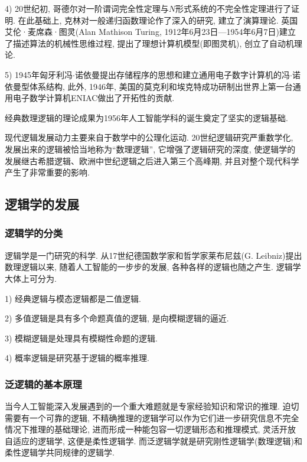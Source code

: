 4) 20世纪初, 哥德尔对一阶谓词完全性定理与$N$形式系统的不完全性定理进行了证明. 在此基础上, 克林对一般递归函数理论作了深入的研究, 建立了演算理论. 英国艾伦·麦席森·图灵(Alan Mathison Turing, 1912年6月23日—1954年6月7日)建立了描述算法的机械性思维过程, 提出了理想计算机模型(即图灵机), 创立了自动机理论.

5) 1945年匈牙利冯$\cdot$诺依曼提出存储程序的思想和建立通用电子数字计算机的冯$\cdot$诺依曼型体系结构, 此外, 1946年, 美国的莫克利和埃克特成功研制出世界上第一台通用电子数学计算机ENIAC做出了开拓性的贡献.
\begin{remark}
经典数理逻辑的理论成果为1956年人工智能学科的诞生奠定了坚实的逻辑基础.

现代逻辑发展动力主要来自于数学中的公理化运动. 20世纪逻辑研究严重数学化, 发展出来的逻辑被恰当地称为“数理逻辑”, 它增强了逻辑研究的深度, 使逻辑学的发展继古希腊逻辑、欧洲中世纪逻辑之后进入第三个高峰期, 并且对整个现代科学产生了非常重要的影响.
\end{remark}

\subsection{逻辑学的发展}
\subsubsection{逻辑学的分类}

逻辑学是一门研究的科学.  从17世纪德国数学家和哲学家莱布尼兹(G. Leibniz)提出数理逻辑以来, 随着人工智能的一步步的发展, 各种各样的逻辑也随之产生.
逻辑学大体上可分为. 

1) 经典逻辑与模态逻辑都是二值逻辑. 

2) 多值逻辑是具有多个命题真值的逻辑, 是向模糊逻辑的逼近. 

3) 模糊逻辑是处理具有模糊性命题的逻辑. 

4) 概率逻辑是研究基于逻辑的概率推理.
\subsubsection{泛逻辑的基本原理}

当今人工智能深入发展遇到的一个重大难题就是专家经验知识和常识的推理. 迫切需要有一个可靠的逻辑, 不精确推理的逻辑学可以作为它们进一步研究信息不完全情况下推理的基础理论, 进而形成一种能包容一切逻辑形态和推理模式, 灵活开放自适应的逻辑学, 这便是柔性逻辑学. 而泛逻辑学就是研究刚性逻辑学(数理逻辑)和柔性逻辑学共同规律的逻辑学.

